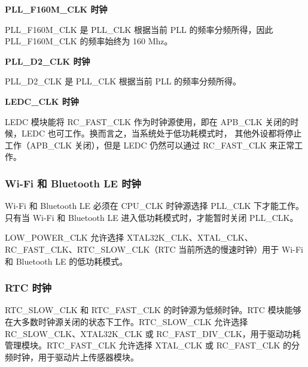 \documentclass[main\_\_CN.tex]{subfiles}
\begin{document}
\textbf{PLL\_F160M\_CLK 时钟}

PLL\_F160M\_CLK 是 PLL\_CLK 根据当前 PLL 的频率分频所得，因此 PLL\_F160M\_CLK 的频率始终为 160 Mhz。 

\textbf{PLL\_D2\_CLK 时钟}

PLL\_D2\_CLK 是 PLL\_CLK 根据当前 PLL 的频率分频所得。

\textbf{LEDC\_CLK 时钟}

LEDC 模块能将 RC\_FAST\_CLK 作为时钟源使用，即在 APB\_CLK 关闭的时候，LEDC 也可工作。换而言之，当系统处于低功耗模式时，
其他外设都将停止工作（APB\_CLK 关闭），但是 LEDC 仍然可以通过 RC\_FAST\_CLK 来正常工作。

\subsubsection{Wi-Fi 和 Bluetooth LE 时钟}
Wi-Fi 和 Bluetooth LE 必须在 CPU\_CLK 时钟源选择 PLL\_CLK 下才能工作。只有当 Wi-Fi 和 Bluetooth LE 进入低功耗模式时，才能暂时关闭 PLL\_CLK。

LOW\_POWER\_CLK 允许选择 XTAL32K\_CLK、XTAL\_CLK、RC\_FAST\_CLK、RTC\_SLOW\_CLK（RTC 当前所选的慢速时钟）用于 Wi-Fi 和 Bluetooth LE 的低功耗模式。


\subsubsection{RTC 时钟}

RTC\_SLOW\_CLK 和 RTC\_FAST\_CLK 的时钟源为低频时钟。RTC 模块能够在大多数时钟源关闭的状态下工作。RTC\_SLOW\_CLK 允许选择 RC\_SLOW\_CLK、XTAL32K\_CLK 或 RC\_FAST\_DIV\_CLK，用于驱动功耗管理模块。RTC\_FAST\_CLK 允许选择 XTAL\_CLK 或 RC\_FAST\_CLK 的分频时钟，用于驱动片上传感器模块。
\end{document}
